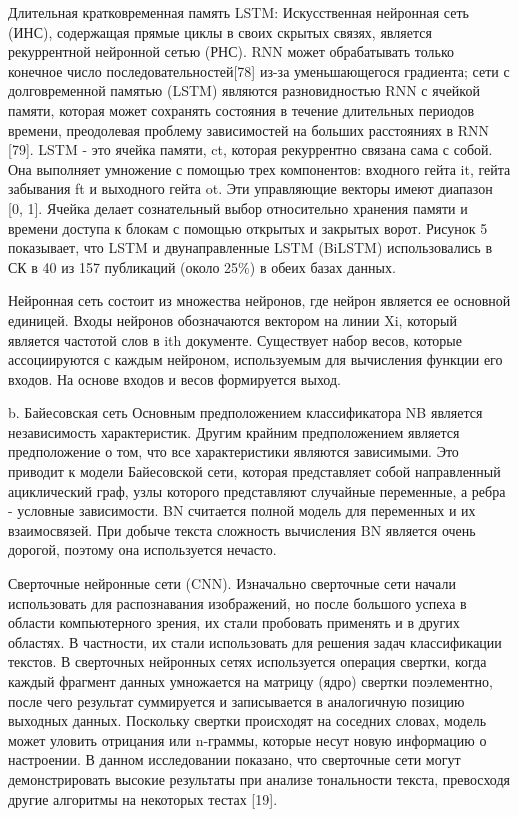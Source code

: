 Длительная кратковременная память LSTM: Искусственная нейронная сеть (ИНС),
содержащая прямые циклы в своих скрытых связях, является рекуррентной нейронной
сетью (РНС). RNN может обрабатывать только конечное число
последовательностей[78] из-за уменьшающегося градиента; сети с долговременной
памятью (LSTM) являются разновидностью RNN с ячейкой памяти, которая может
сохранять состояния в течение длительных периодов времени, преодолевая проблему
зависимостей на больших расстояниях в RNN [79]. LSTM - это ячейка памяти, ct,
которая рекуррентно связана сама с собой. Она выполняет умножение с помощью трех
компонентов: входного гейта it, гейта забывания ft и выходного гейта ot. Эти
управляющие векторы имеют диапазон [0, 1]. Ячейка делает сознательный выбор
относительно хранения памяти и времени доступа к блокам с помощью открытых и
закрытых ворот. Рисунок 5 показывает, что LSTM и двунаправленные LSTM (BiLSTM)
использовались в СК в 40 из 157 публикаций (около 25\%) в обеих базах данных.
\cite{article2}

Нейронная сеть состоит из множества нейронов, где нейрон является ее основной
единицей. Входы нейронов обозначаются вектором на линии Xi, который является
частотой слов в ith документе. Существует набор весов, которые ассоциируются с
каждым нейроном, используемым для вычисления функции его входов. На основе
входов и весов формируется выход. \cite{article4}

b. Байесовская сеть
Основным предположением классификатора NB является независимость характеристик.
Другим крайним предположением является предположение о том, что все
характеристики являются зависимыми. Это приводит к модели Байесовской сети,
которая представляет собой направленный ациклический граф, узлы которого
представляют случайные переменные, а ребра - условные зависимости. BN считается
полной модель для переменных и их взаимосвязей. При добыче текста сложность
вычисления BN является очень дорогой, поэтому она используется нечасто.
\cite{article4}

Сверточные нейронные сети (CNN). Изначально сверточные сети начали использовать
для распознавания изображений, но после большого успеха в области компьютерного
зрения, их стали пробовать применять и в других областях. В частности, их стали
использовать для решения задач классификации текстов. В сверточных нейронных
сетях используется операция свертки, когда каждый фрагмент данных умножается на
матрицу (ядро) свертки поэлементно, после чего результат суммируется и
записывается в аналогичную позицию выходных данных. Поскольку свертки происходят
на соседних словах, модель может уловить отрицания или n-граммы, которые несут
новую информацию о настроении. В данном исследовании показано, что сверточные
сети могут демонстрировать высокие результаты при анализе тональности текста,
превосходя другие алгоритмы на некоторых тестах [19]. \cite{article9}

